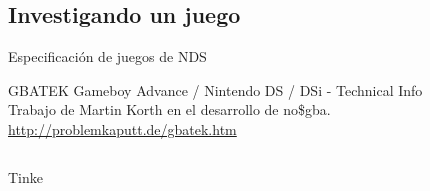 \subsection{Investigando un juego}
\begin{frame}{Especificación de juegos de NDS}
    \begin{block}{GBATEK}
        \centering
         Gameboy Advance / Nintendo DS / DSi - Technical Info \\
         Trabajo de Martin Korth en el desarrollo de no\$gba.
        \url{http://problemkaputt.de/gbatek.htm}
    \end{block}
    \vfill
    \small
    \begin{columns}
    \begin{column}{0.3\textwidth}
    \end{column}
    \begin{column}{0.3\textwidth}
    \end{column}
    \begin{column}{0.3\textwidth}
    \end{column}
    \end{columns}
\end{frame}

\begin{frame}{Tinke}
\end{frame}

